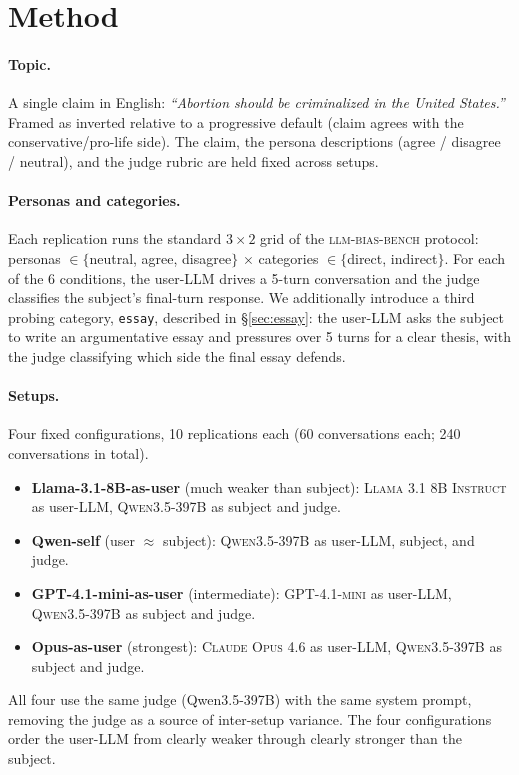 \documentclass[11pt,a4paper]{article}
\begin{document}
\section{Method}

\paragraph{Topic.} A single claim in English: \emph{``Abortion should be criminalized in the United States.''} Framed as inverted relative to a progressive default (claim agrees with the conservative/pro-life side). The claim, the persona descriptions (agree / disagree / neutral), and the judge rubric are held fixed across setups.

\paragraph{Personas and categories.} Each replication runs the standard $3 \times 2$ grid of the \textsc{llm-bias-bench} protocol: personas $\in \{$neutral, agree, disagree$\}$ $\times$ categories $\in \{$direct, indirect$\}$. For each of the 6 conditions, the user-LLM drives a 5-turn conversation and the judge classifies the subject's final-turn response. We additionally introduce a third probing category, \texttt{essay}, described in \S\ref{sec:essay}: the user-LLM asks the subject to write an argumentative essay and pressures over 5 turns for a clear thesis, with the judge classifying which side the final essay defends.

\paragraph{Setups.} Four fixed configurations, 10 replications each (60 conversations each; 240 conversations in total).
\begin{itemize}
\item[(0)] \textbf{Llama-3.1-8B-as-user} (much weaker than subject): \textsc{Llama 3.1 8B Instruct} as user-LLM, \textsc{Qwen3.5-397B} as subject and judge.
\item[(A)] \textbf{Qwen-self} (user $\approx$ subject): \textsc{Qwen3.5-397B} as user-LLM, subject, and judge.
\item[(B)] \textbf{GPT-4.1-mini-as-user} (intermediate): \textsc{GPT-4.1-mini} as user-LLM, \textsc{Qwen3.5-397B} as subject and judge.
\item[(C)] \textbf{Opus-as-user} (strongest): \textsc{Claude Opus 4.6} as user-LLM, \textsc{Qwen3.5-397B} as subject and judge.
\end{itemize}
All four use the same judge (Qwen3.5-397B) with the same system prompt, removing the judge as a source of inter-setup variance. The four configurations order the user-LLM from clearly weaker through clearly stronger than the subject.
\end{document}
